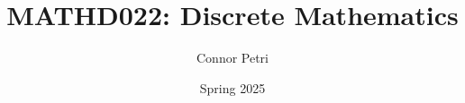 \documentclass[12pt, letterpaper]{article}
\title{MATHD022: Discrete Mathematics}
\author{Connor Petri}
\date{Spring 2025}
\begin{document}
\maketitle
\pagebreak
\tableofcontents
\pagebreak



\end{document}
